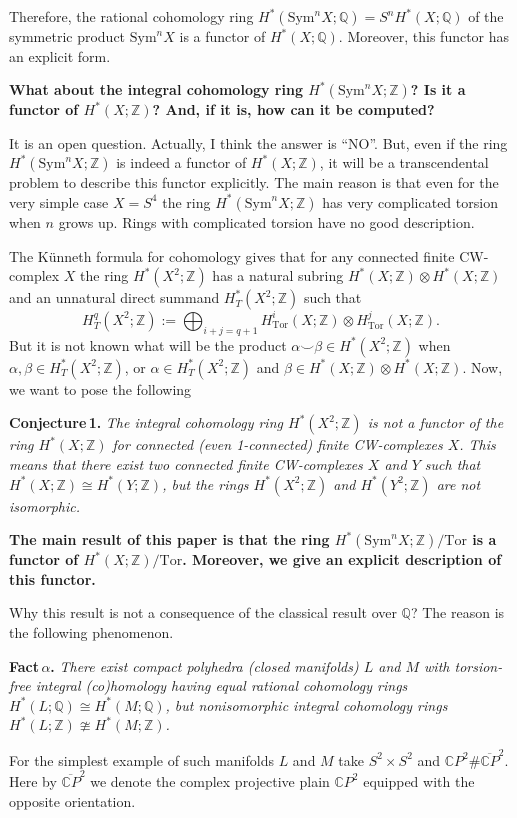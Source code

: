 \documentclass[a4paper,14pt]{article}
\newcommand{\Sym}{\mathrm{Sym}}
\newcommand{\Tor}{\mathrm{Tor}}
\newcommand{\Q}{\mathbb{Q}}
\newcommand{\Z}{\mathbb{Z}}
\newcommand{\Cn}{\mathbb{C}}
\begin{document}
Therefore, the rational cohomology ring $H^*(\Sym^n X;\Q) = S^n H^*(X;\Q)$ of the symmetric product $\Sym^n X$ is a functor of $H^*(X;\Q)$. Moreover, this functor has an explicit form.

{\bf What about the integral cohomology ring $H^*(\Sym^n X;\Z)$? Is it a functor of $H^*(X;\Z)$? And, if it is, how can it be computed?}


It is an open question. Actually, I think the answer is ``NO''. But, even if the ring $H^*(\Sym^n X;\Z)$ is indeed a functor of $H^*(X;\Z)$, it will be a transcendental problem to describe this functor explicitly. The main reason is that even for the very simple case $X=S^4$ the ring $H^*(\Sym^n X;\Z)$ has very complicated torsion when $n$ grows up. Rings with complicated torsion have no good description. 


The K\"unneth formula for cohomology gives that for any connected finite CW-complex $X$ the ring $H^*(X^2;\Z)$ has a natural subring $H^*(X;\Z)\otimes H^*(X;\Z)$ and an unnatural direct summand $H_{T}^*(X^2;\Z)$ such that 
$$
H_T^q(X^2;\Z) := \bigoplus_{i+j=q+1} H_{\Tor}^i(X;\Z) \otimes H_{\Tor}^j(X;\Z).
$$
But it is not known what will be the product $\alpha\smile \beta\in H^*(X^2;\Z)$ when $\alpha, \beta \in  H^*_{T}(X^2;\Z)$, or $\alpha \in  H_{T}^*(X^2;\Z)$ and $\beta\in H^*(X;\Z)\otimes H^*(X;\Z)$. Now, we want to pose the following

{\bf Conjecture\,1.} {\it The integral cohomology ring $H^*(X^2;\Z)$ is not a functor of the ring $H^*(X;\Z)$ for connected (even 1-connected) finite CW-complexes $X$. This means that there exist two connected finite CW-complexes $X$ and $Y$ such that $H^*(X;\Z)\cong H^*(Y;\Z)$, but the rings $H^*(X^2;\Z)$ and $H^*(Y^2;\Z)$ are not isomorphic.}


{\bf The main result of this paper is that the ring $H^*(\Sym^n X;\Z)/\Tor$ is a functor of $H^*(X;\Z)/\Tor$. Moreover, we give an explicit description of this functor.} 

Why this result is not a consequence of the classical result over $\Q$? The reason is the following phenomenon.  

{\bf Fact\,$\alpha$.} {\it There exist compact polyhedra (closed manifolds) $L$ and $M$ with torsion-free integral (co)homology having equal rational cohomology rings $H^*(L;\Q)\cong H^*(M;\Q)$, but nonisomorphic integral cohomology rings $H^*(L;\Z)\ncong H^*(M;\Z)$.}

For the simplest example of such manifolds $L$ and $M$ take $S^2\times S^2$ and $\Cn P^2 \# \overline{\Cn P}^2$. Here by $ \overline{\Cn P}^2$ we denote the complex projective plain $\Cn P^2$ equipped with the opposite orientation. 
\end{document}
